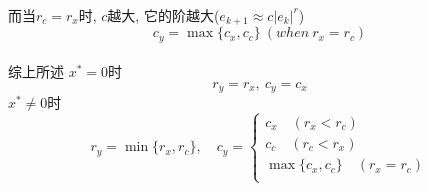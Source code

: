\documentclass{article}
\begin{document}
\begin{CJK}{UTF8}{gbsn}
  \paragraph{}
  而当$r_c = r_x$时, $c$越大, 它的阶越大($e_{k + 1} \approx c|e_{k}|^r$)
  \begin{equation}
    c_y = \max\{c_x, c_c\}\ (when\ r_x = r_c)
  \end{equation}
  \paragraph{}
  综上所述
  $x^* = 0$时
  \begin{equation}
    r_y = r_x,\ c_y = c_x
  \end{equation}
  $x^* \not= 0$时
  \begin{equation}
    r_y = \min\{r_x, r_c\}, \quad
    c_y =
    \begin{cases}
      c_x \quad (r_x < r_c) \\
      c_c \quad (r_c < r_x) \\
      \max\{c_x, c_c\} \quad (r_x = r_c) \\
    \end{cases}
  \end{equation}
\end{CJK}
\end{document}
